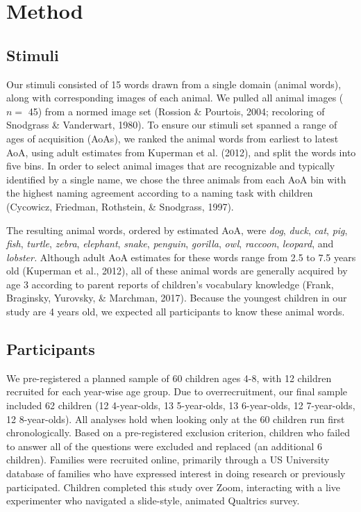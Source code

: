 \documentclass[10pt, letterpaper]{article}
\begin{document}
\hypertarget{method}{%
\section{Method}\label{method}}

\hypertarget{stimuli}{%
\subsection{Stimuli}\label{stimuli}}

Our stimuli consisted of 15 words drawn from a single domain (animal
words), along with corresponding images of each animal. We pulled all
animal images (\(n =\) 45) from a normed image set (Rossion \& Pourtois,
2004; recoloring of Snodgrass \& Vanderwart, 1980). To ensure our
stimuli set spanned a range of ages of acquisition (AoAs), we ranked the
animal words from earliest to latest AoA, using adult estimates from
Kuperman et al. (2012), and split the words into five bins. In order to
select animal images that are recognizable and typically identified by a
single name, we chose the three animals from each AoA bin with the
highest naming agreement according to a naming task with children
(Cycowicz, Friedman, Rothstein, \& Snodgrass, 1997).

The resulting animal words, ordered by estimated AoA, were \emph{dog},
\emph{duck}, \emph{cat}, \emph{pig}, \emph{fish}, \emph{turtle},
\emph{zebra}, \emph{elephant}, \emph{snake}, \emph{penguin},
\emph{gorilla}, \emph{owl}, \emph{raccoon}, \emph{leopard}, and
\emph{lobster.} Although adult AoA estimates for these words range from
2.5 to 7.5 years old (Kuperman et al., 2012), all of these animal words
are generally acquired by age 3 according to parent reports of
children's vocabulary knowledge (Frank, Braginsky, Yurovsky, \&
Marchman, 2017). Because the youngest children in our study are 4 years
old, we expected all participants to know these animal words.

\hypertarget{participants}{%
\subsection{Participants}\label{participants}}

We pre-registered a planned sample of 60 children ages 4-8, with 12
children recruited for each year-wise age group. Due to overrecruitment,
our final sample included 62 children (12 4-year-olds, 13 5-year-olds,
13 6-year-olds, 12 7-year-olds, 12 8-year-olds). All analyses hold when
looking only at the 60 children run first chronologically. Based on a
pre-registered exclusion criterion, children who failed to answer all of
the questions were excluded and replaced (an additional 6 children).
Families were recruited online, primarily through a US University
database of families who have expressed interest in doing research or
previously participated. Children completed this study over Zoom,
interacting with a live experimenter who navigated a slide-style,
animated Qualtrics survey.
\end{document}
